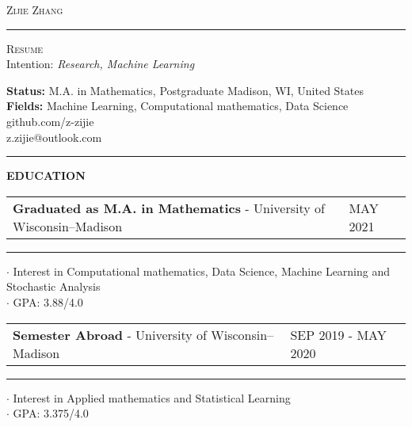 \documentclass[11pt,A4]{article}
\newcommand{\cvsection}[1]
{
	\begin{center}
		\large\textcolor{sectcol}{\textbf{#1}}
	\end{center}
}
\newcommand{\metasection}[2]
{
\footnotesize{#2} \hspace*{\fill} \footnotesize{#1}\\[1pt]
}
\newcommand{\cvevent}[3]
{

\begin{tabular*}{1\textwidth}{p{13.6cm}  x{3.9cm}}
	\textbf{#2} - \textcolor{bgcol}{#3} &   \vspace{2.5pt}\textcolor{sectcol}{#1}
\end{tabular*}

\vspace{-8pt}
\textcolor{softcol}{\hrule}
\vspace{6pt}


}
\begin{document}
\pagestyle{fancy}

\vspace{-8pt}
\begin{center}
    \HUGE   \textsc{Zijie Zhang}
            \textcolor{sectcol}{\rule[-1mm]{1mm}{0.9cm}}
            \textsc{Resume}\\[2pt]
	\small  Intention: \textit{Research, Machine Learning}
\end{center}

\vspace{6pt}

\metasection{Madison, WI, United States}{\textbf{Status:} M.A. in Mathematics, Postgraduate}
\metasection{github.com/z-zijie}{\textbf{Fields:} Machine Learning, Computational mathematics, Data Science} 
\metasection{z.zijie@outlook.com}{}
\vspace{-2pt}
\textcolor{softcol}{\hrule}
\vspace{6pt}

\normalsize




\cvsection{EDUCATION}

\cvevent{MAY 2021}
        {Graduated as M.A. in Mathematics}
        {University of Wisconsin–Madison}

        $\cdot$ Interest in Computational mathematics, Data Science, Machine Learning and Stochastic Analysis\\
        $\cdot$ GPA: 3.88/4.0 \\

\cvevent{SEP 2019 - MAY 2020}
        {Semester Abroad}
        {University of Wisconsin–Madison}
        $\cdot$ Interest in Applied mathematics and Statistical Learning\\
        $\cdot$ GPA: 3.375/4.0 \\
\end{document}
